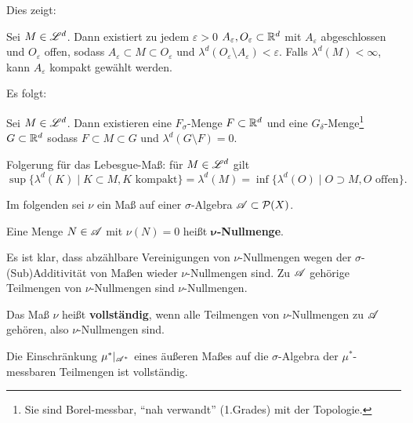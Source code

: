 Dies zeigt:

\begin{satz}
\begin{mdframed}
Sei $M \in \LL^d$. Dann existiert zu jedem $\varepsilon>0$ $A_\varepsilon, O_\varepsilon \subset \R^d$ mit $A_\varepsilon$ abgeschlossen und $O_\varepsilon$ offen, sodass
${A_\varepsilon} \subset M \subset {O_\varepsilon}$
und 
$\lambda^d(O_\varepsilon \setminus A_\varepsilon) < \varepsilon$.
Falls $\lambda^d(M)<\infty$, kann $A_\varepsilon$ kompakt gewählt werden.
\end{mdframed}
\end{satz}

Es folgt:
\begin{satz}
\begin{mdframed}
Sei $M\in \LL^d$. Dann existieren eine $F_\sigma$-Menge $F\subset \R^d$ und eine $G_\delta$-Menge\footnote{Sie sind Borel-messbar, ``nah verwandt'' (1.Grades) mit der Topologie.}  $G\subset \R^d$ sodass $F\subset M \subset G$ und $\lambda^d(G\setminus F)=0$.
\end{mdframed}
\end{satz}

Folgerung für das Lebesgue-Maß: für $M\in \LL^d$ gilt
$$
\boxed{\sup\{\lambda^d(K) \mid K \subset M, K \text{ kompakt}\} = \lambda^d(M)=\inf \{\lambda^d(O)\mid O \supset M, O \text{ offen}\}}.
$$

Im folgenden sei $\nu$ ein Maß auf einer $\sigma$-Algebra $\AA \subset \PP(X)$.

\begin{definition}
\begin{mdframed}
Eine Menge $N\in \AA$ mit $\nu(N)=0$ heißt \textbf{$\boldsymbol{\nu}$-Nullmenge}.
\end{mdframed}
\end{definition}
Es ist klar, dass abzählbare Vereinigungen von $\nu$-Nullmengen wegen der $\sigma$-(Sub)Additivität von Maßen wieder $\nu$-Nullmengen sind. Zu $\AA$ gehörige Teilmengen von $\nu$-Nullmengen sind $\nu$-Nullmengen.

\begin{definition}
\begin{mdframed}
Das Maß $\nu$ heißt \textbf{vollständig}, wenn alle Teilmengen von $\nu$-Nullmengen zu $\AA$ gehören, also $\nu$-Nullmengen sind.
\end{mdframed}
\end{definition}

\begin{example}
Die Einschränkung $\mu^*|_{\AA^*}$ eines äußeren Maßes auf die $\sigma$-Algebra der $\mu^*$-messbaren Teilmengen ist vollständig.
\end{example}

